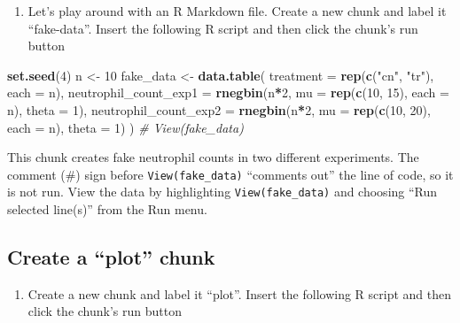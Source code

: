\documentclass[]{book}
\newenvironment{Shaded}{\begin{snugshade}}{\end{snugshade}}
\newcommand{\CommentTok}[1]{\textcolor[rgb]{0.56,0.35,0.01}{\textit{#1}}}
\newcommand{\DataTypeTok}[1]{\textcolor[rgb]{0.13,0.29,0.53}{#1}}
\newcommand{\DecValTok}[1]{\textcolor[rgb]{0.00,0.00,0.81}{#1}}
\newcommand{\KeywordTok}[1]{\textcolor[rgb]{0.13,0.29,0.53}{\textbf{#1}}}
\newcommand{\NormalTok}[1]{#1}
\newcommand{\OperatorTok}[1]{\textcolor[rgb]{0.81,0.36,0.00}{\textbf{#1}}}
\newcommand{\StringTok}[1]{\textcolor[rgb]{0.31,0.60,0.02}{#1}}
\providecommand{\tightlist}{%
  \setlength{\itemsep}{0pt}\setlength{\parskip}{0pt}}
\begin{document}
\begin{enumerate}
\def\labelenumi{\arabic{enumi}.}
\setcounter{enumi}{3}
\tightlist
\item
  Let's play around with an R Markdown file. Create a new chunk and label it ``fake-data''. Insert the following R script and then click the chunk's run button
\end{enumerate}

\begin{Shaded}
\begin{Highlighting}[]
\KeywordTok{set.seed}\NormalTok{(}\DecValTok{4}\NormalTok{)}
\NormalTok{n <-}\StringTok{ }\DecValTok{10}
\NormalTok{fake_data <-}\StringTok{ }\KeywordTok{data.table}\NormalTok{(}
    \DataTypeTok{treatment =} \KeywordTok{rep}\NormalTok{(}\KeywordTok{c}\NormalTok{(}\StringTok{"cn"}\NormalTok{, }\StringTok{"tr"}\NormalTok{), }\DataTypeTok{each =}\NormalTok{ n),}
    \DataTypeTok{neutrophil_count_exp1 =} \KeywordTok{rnegbin}\NormalTok{(n}\OperatorTok{*}\DecValTok{2}\NormalTok{, }
                                    \DataTypeTok{mu =} \KeywordTok{rep}\NormalTok{(}\KeywordTok{c}\NormalTok{(}\DecValTok{10}\NormalTok{, }\DecValTok{15}\NormalTok{), }\DataTypeTok{each =}\NormalTok{ n),}
                                    \DataTypeTok{theta =} \DecValTok{1}\NormalTok{),}
    \DataTypeTok{neutrophil_count_exp2 =} \KeywordTok{rnegbin}\NormalTok{(n}\OperatorTok{*}\DecValTok{2}\NormalTok{, }
                                    \DataTypeTok{mu =} \KeywordTok{rep}\NormalTok{(}\KeywordTok{c}\NormalTok{(}\DecValTok{10}\NormalTok{, }\DecValTok{20}\NormalTok{), }\DataTypeTok{each =}\NormalTok{ n),}
                                    \DataTypeTok{theta =} \DecValTok{1}\NormalTok{)}
\NormalTok{)}
\CommentTok{# View(fake_data)}
\end{Highlighting}
\end{Shaded}

This chunk creates fake neutrophil counts in two different experiments. The comment (\#) sign before \texttt{View(fake\_data)} ``comments out'' the line of code, so it is not run. View the data by highlighting \texttt{View(fake\_data)} and choosing ``Run selected line(s)'' from the Run menu.

\hypertarget{create-a-plot-chunk}{%
\subsection{Create a ``plot'' chunk}\label{create-a-plot-chunk}}

\begin{enumerate}
\def\labelenumi{\arabic{enumi}.}
\setcounter{enumi}{4}
\tightlist
\item
  Create a new chunk and label it ``plot''. Insert the following R script and then click the chunk's run button
\end{enumerate}
\end{document}
